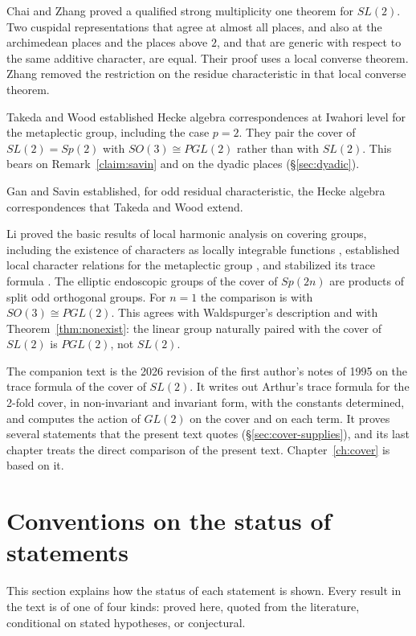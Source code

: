 \documentclass[12pt,letterpaper,openany]{book}
\theoremstyle{plain}
\theoremstyle{definition}
\theoremstyle{remark}
\theoremstyle{remark}
\begin{document}
Chai and Zhang \cite{CZ} proved a qualified strong multiplicity one
theorem for $SL(2)$. Two cuspidal representations that agree at almost all
places, and also at the archimedean places and the places above $2$, and
that are generic with respect to the same additive character, are equal. Their proof uses a local converse theorem. Zhang \cite{Zh} removed
the restriction on the residue characteristic in that local converse
theorem.

Takeda and Wood \cite{TW} established Hecke algebra correspondences at
Iwahori level for the metaplectic group, including the case $p=2$. They
pair the cover of $SL(2)=Sp(2)$ with $SO(3)\cong PGL(2)$ rather than with
$SL(2)$. This bears on Remark~\ref{claim:savin} and on the dyadic places
(\S\ref{sec:dyadic}).

Gan and Savin \cite{GS12} established, for odd residual characteristic,
the Hecke algebra correspondences that Takeda and Wood extend.

Li proved the basic results of local harmonic analysis on covering groups,
including the existence of characters as locally integrable functions
\cite{Li12}, established local character relations for the metaplectic
group \cite{Li19}, and stabilized its trace formula \cite{Li21}. The
elliptic endoscopic groups of the cover of $Sp(2n)$ are products of split
odd orthogonal groups. For $n=1$ the comparison is with
$SO(3)\cong PGL(2)$. This agrees with Waldspurger's description and with
Theorem~\ref{thm:nonexist}: the linear group naturally paired with the
cover of $SL(2)$ is $PGL(2)$, not $SL(2)$.

The companion text \cite{JC} is the 2026 revision of the first author's
notes of 1995 on the trace formula of the cover of $SL(2)$. It writes
out Arthur's trace formula for the 2-fold cover, in non-invariant and
invariant form, with the constants determined, and computes the action
of $GL(2)$ on the cover and on each term. It proves several statements
that the present text quotes (\S\ref{sec:cover-supplies}), and its last
chapter treats the direct comparison of the present text.
Chapter~\ref{ch:cover} is based on it.

\section{Conventions on the status of statements}

This section explains how the status of each statement is shown. Every
result in the text is of one of four kinds: proved here, quoted from the
literature, conditional on stated hypotheses, or conjectural.
\end{document}
